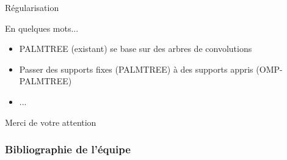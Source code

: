 \begin{frame}{Régularisation}
\end{frame}


\begin{frame}{En quelques mots...}
\begin{itemize}
\item PALMTREE (existant) se base sur des arbres de convolutions
\item Passer des supports fixes (PALMTREE) à des supports appris (OMP-PALMTREE)
\item ...
\end{itemize}
\vfill
\hfill Merci de votre attention
\end{frame}

\appendix

\begin{frame}
\frametitle{Bibliographie de l'équipe}
\nocite{*}
\printbibliography[heading=none]
\end{frame}


